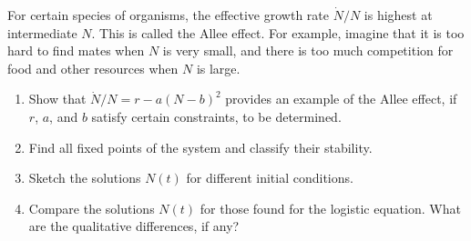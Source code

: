 \documentclass[12 pt, letterpaper]{hmcpset}
\begin{document}
\pagebreak

\begin{problem}[Strogatz 2.3.4]
	For certain species of organisms, the effective growth rate $\dot{N} / N$ is highest at intermediate $N$. This is called the Allee effect. For example, imagine that it is too hard to find mates when $N$ is very small, and there is too much competition for food and other resources when $N$ is large.
	\begin{enumerate}
		\item Show that $\dot{N} / N = r - a(N - b)^{2}$ provides an example of the Allee effect, if $r$, $a$, and $b$ satisfy certain constraints, to be determined.

		\item Find all fixed points of the system and classify their stability.

		\item Sketch the solutions $N(t)$ for different initial conditions.

		\item Compare the solutions $N(t)$ for those found for the logistic equation. What are the qualitative differences, if any?
	\end{enumerate}
\end{problem}
\end{document}
